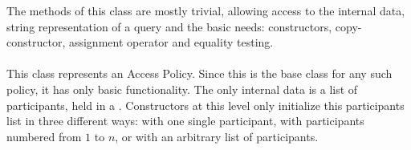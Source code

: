 \documentclass{article}
\begin{document}
The methods of this class are mostly trivial, allowing access to the internal data, string representation of a query and the basic needs: constructors, copy-constructor, assignment operator and equality testing.  

\paragraph{\cAP}
\label{para:cAP}
This class represents an Access Policy. Since this is the base class for any such policy, it has only basic functionality. The only internal data is a list of participants, held in a . Constructors at this level only initialize this participants list in three different ways: with one single participant, with participants numbered from $1$ to $n$, or with an arbitrary list of participants. 
\end{document}
